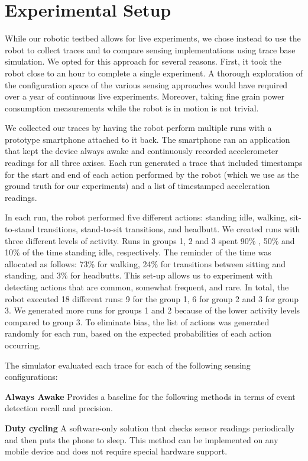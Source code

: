 \section{Experimental Setup}
\label{sec:experimentalSetup}

While our robotic testbed allows for live experiments, we chose
instead to use the robot to collect traces and to compare sensing
implementations using trace base simulation.  We opted for this
approach for several reasons.  First, it took the robot close to an
hour to complete a single experiment.  A thorough exploration of the
configuration space of the various sensing approaches would have
required over a year of continuous live experiments.  Moreover, taking
fine grain power consumption measurements while the robot is in motion
is not trivial.

We collected our traces by having the robot perform multiple runs with
a prototype smartphone attached to it back.  The smartphone ran an
application that kept the device always awake and continuously recorded
accelerometer readings for all three axises.  Each run generated a
trace that included timestamps for the start and end of each action
performed by the robot (which we use as the ground truth for our
experiments) and a list of timestamped acceleration readings.

In each run, the robot performed five different actions: standing
idle, walking, sit-to-stand transitions, stand-to-sit transitions, and
headbutt.  We created runs with three different levels of activity.
Runs in groups 1, 2 and 3 spent 90\% , 50\% and 10\% of the time
standing idle, respectively. The reminder of the time was allocated as
follows: 73\% for walking, 24\% for transitions between sitting and
standing, and 3\% for headbutts.  This set-up allows us to experiment
with detecting actions that are common, somewhat frequent, and rare.
In total, the robot executed 18 different runs: 9 for the group 1, 6
for group 2 and 3 for group 3.  We generated more runs for groups 1
and 2 because of the lower activity levels compared to group 3. To
eliminate bias, the list of actions was generated randomly for each
run, based on the expected probabilities of each action occurring.

The simulator evaluated each trace for each of the following sensing
configurations:


\textbf{Always Awake} Provides a baseline for the following
  methods in terms of event detection recall and precision.

\textbf{Duty cycling} A software-only solution that checks
  sensor readings periodically and then puts the phone to sleep. This
  method can be implemented on any mobile device and does not require
  special hardware support.

